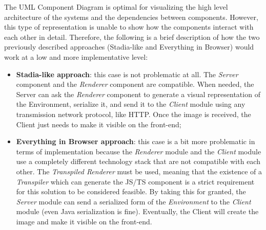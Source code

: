 The UML Component Diagram is optimal for visualizing the high level architecture of the systems and the dependencies between components. However, this type of representation is unable to show how the components interact with each other in detail. Therefore, the following is a brief description of how the two previously described approaches (Stadia-like and Everything in Browser) would work at a low and more implementative level:
\begin{itemize}
	\item \textbf{Stadia-like approach}: this case is not problematic at all. The \textit{Server} component and the \textit{Renderer} component are compatible. When needed, the Server can ask the \textit{Renderer} component to generate a visual representation of the Environment, serialize it, and send it to the \textit{Client} module using any transmission network protocol, like HTTP. Once the image is received, the Client just needs to make it visible on the front-end;
	\item \textbf{Everything in Browser approach}: this case is a bit more problematic in terms of implementation because the \textit{Renderer} module and the \textit{Client} module use a completely different technology stack that are not compatible with each other. The \textit{Transpiled Renderer} must be used, meaning that the existence of a \textit{Transpiler} which can generate the JS/TS component is a strict requirement for this solution to be considered feasible.
	By taking this for granted, the \textit{Server} module can send a serialized form of the \textit{Environment} to the \textit{Client} module (even Java serialization is fine). Eventually, the Client will create the image and make it visible on the front-end.
\end{itemize}
